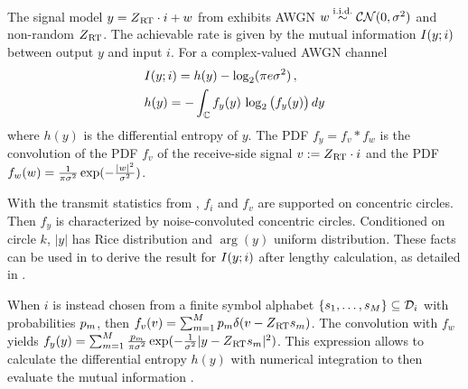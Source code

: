 The signal model $y = Z_{\hspace{.2mm}\mathrm{RT}} \cdot i + w$ from  exhibits AWGN $w \overset{\text{i.i.d.}}{\sim} \mathcal{CN}(0,\sigma^2)$ and non-random $Z_{\hspace{.2mm}\mathrm{RT}}$. The achievable rate is given by the mutual information $I(y;i)$ between output $y$ and input $i$. For a complex-valued AWGN channel \cite[(B.47)]{Tse2005}
\begin{align}
& I(y;i) = h(y) - \log_2(\pi e \sigma^2)
\, , \label{eq:MutualInfo} \\
& h(y) = -\int_{\mathbb{C}} f_y(y) \, \log_2\big( f_y(y) \big) \,dy
\label{eq:DifferentialEntropy}
\end{align}
where $h(y)$ is the differential entropy of $y$.
The PDF $f_y = f_v * f_w$ is the convolution of the PDF $f_v$ of the receive-side signal $v := Z_{\hspace{.2mm}\mathrm{RT}} \cdot i$ and the PDF
$f_w(w) = \frac{1}{\pi \sigma^2} \exp(-\frac{|w|^2}{\sigma^2})$.

With the transmit statistics from , $f_i$ and $f_v$ are supported on concentric circles. Then $f_y$ is characterized by noise-convoluted concentric circles. Conditioned on circle $k$, $|y|$ has Rice distribution and $\arg(y)$ uniform distribution. These facts can be used in  to derive the result  for $I(y;i)$ after lengthy calculation, as detailed in \cite{ShamaiTIT1995}.

When $i$ is instead chosen from a finite symbol alphabet $\{ s_1 , \ldots , s_{M} \} \subseteq \mathcal{D}_i$ with probabilities $p_m$, then
$f_v(v) = \sum_{m=1}^M p_m \delta(v - Z_{\hspace{.2mm}\mathrm{RT}} s_m)$.
The convolution with $f_w$ yields
$f_y(y) = \sum_{m=1}^M \frac{p_m}{\pi \sigma^2} \exp(-\frac{1}{\sigma^2} |y - Z_{\hspace{.2mm}\mathrm{RT}} s_m|^2 )$.
This expression allows to calculate the differential entropy $h(y)$ with numerical integration to then evaluate the mutual information .


